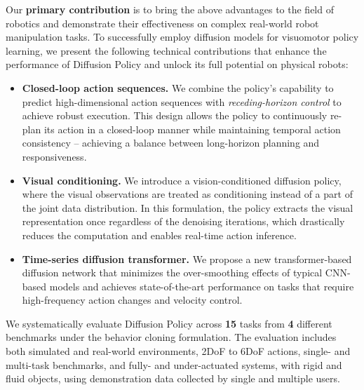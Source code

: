 \documentclass[Afour,sageh,times]{sagej}
\begin{document}
Our \textbf{primary contribution} is to bring the above advantages to the field of robotics and demonstrate their effectiveness on complex real-world robot manipulation tasks. To successfully employ diffusion models for visuomotor policy learning, we present the following technical contributions that enhance the performance of Diffusion Policy and unlock its full potential on physical robots:
\begin{itemize} %
    \item \textbf{Closed-loop action sequences.} We combine the policy's capability to predict high-dimensional action sequences with \textit{receding-horizon control} to achieve robust execution. This design allows the policy to continuously re-plan its action in a closed-loop manner while maintaining temporal action consistency -- achieving a balance between long-horizon planning and responsiveness. 


    \item \textbf{Visual conditioning.} We introduce a vision-conditioned diffusion policy, where the visual observations are treated as conditioning instead of a part of the joint data distribution.  In this formulation, the policy extracts the visual representation once regardless of the denoising iterations, which drastically reduces the computation and enables real-time action inference. 


    \item \textbf{Time-series diffusion transformer.} We propose a new transformer-based diffusion network  that minimizes the over-smoothing effects of typical CNN-based models and achieves state-of-the-art performance on tasks that require high-frequency action changes and velocity control. 
\end{itemize}

We systematically evaluate Diffusion Policy across \textbf{15} tasks from \textbf{4} different benchmarks \cite{ibc, gupta2019relay, robomimic, bet} under the behavior cloning formulation. The evaluation includes both simulated and real-world environments, 2DoF to 6DoF actions, single- and multi-task benchmarks, and fully- and under-actuated systems, with rigid and fluid objects, using demonstration data collected by single and multiple users.  
\end{document}
